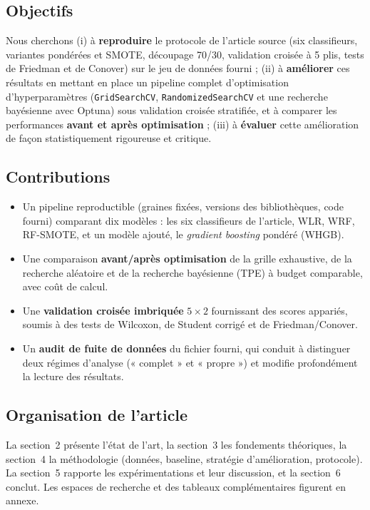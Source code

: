 \subsection{Objectifs}
Nous cherchons (i) à \textbf{reproduire} le protocole de l'article source (six classifieurs, variantes pondérées et SMOTE, découpage 70/30, validation croisée à 5 plis, tests de Friedman et de Conover) sur le jeu de données fourni ; (ii) à \textbf{améliorer} ces résultats en mettant en place un pipeline complet d'optimisation d'hyperparamètres (\texttt{GridSearchCV}, \texttt{RandomizedSearchCV} et une recherche bayésienne avec Optuna) sous validation croisée stratifiée, et à comparer les performances \textbf{avant et après optimisation} ; (iii) à \textbf{évaluer} cette amélioration de façon statistiquement rigoureuse et critique.

\subsection{Contributions}
\begin{itemize}[leftmargin=*,itemsep=0pt,topsep=2pt]
\item Un pipeline reproductible (graines fixées, versions des bibliothèques, code fourni) comparant dix modèles : les six classifieurs de l'article, WLR, WRF, RF-SMOTE, et un modèle ajouté, le \emph{gradient boosting} pondéré (WHGB).
\item Une comparaison \textbf{avant/après optimisation} de la grille exhaustive, de la recherche aléatoire et de la recherche bayésienne (TPE) à budget comparable, avec coût de calcul.
\item Une \textbf{validation croisée imbriquée} $5\times 2$ fournissant des scores appariés, soumis à des tests de Wilcoxon, de Student corrigé \cite{nadeau2003} et de Friedman/Conover.
\item Un \textbf{audit de fuite de données} du fichier fourni, qui conduit à distinguer deux régimes d'analyse (« complet » et « propre ») et modifie profondément la lecture des résultats.
\end{itemize}

\subsection{Organisation de l'article}
La section~2 présente l'état de l'art, la section~3 les fondements théoriques, la section~4 la méthodologie (données, baseline, stratégie d'amélioration, protocole). La section~5 rapporte les expérimentations et leur discussion, et la section~6 conclut. Les espaces de recherche et des tableaux complémentaires figurent en annexe.
